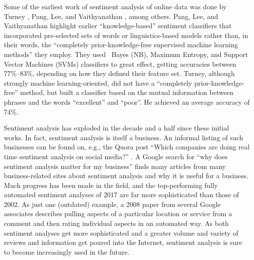 Some of the earliest work of sentiment analysis of online data was done by Turney \cite{turney2002}, Pang, Lee, and Vaithyanathan \cite{pang2002}, among others.  Pang, Lee, and Vaithyanathan highlight earlier ``knowledge-based'' sentiment classifiers that incorporated pre-selected sets of words or linguistics-based models rather than, in their words, the ``completely prior-knowledge-free supervised machine learning methods'' they employ.  They used \Na\ Bayes (NB), Maximum Entropy, and Support Vector Machines (SVMs) classifiers to great effect, getting accuracies between 77\%--83\%, depending on how they defined their feature set.  Turney, although strongly machine learning-oriented, did not have a ``completely prior-knowledge-free'' method, but built a classifier based on the mutual information between phrases and the words ``excellent'' and ``poor''.  He achieved an average accuracy of 74\%.

Sentiment analysis has exploded in the decade and a half since these initial works.  In fact, sentiment analysis is itself a business.  An informal listing of such businesses can be found on, e.g., the Quora post ``Which companies are doing real time sentiment analysis on social media?'' \cite{quora}.  A Google search for ``why does sentiment analysis matter for my business'' finds many articles from many business-related sites about sentiment analysis and why it is useful for a business.  Much progress has been made in the field, and the top-performing fully automated sentiment analyses of 2017 are far more sophisticated than those of 2002.  As just one (outdated) example, a 2008 paper from several Google associates \cite{blair2008} describes pulling aspects of a particular location or service from a comment and then rating individual aspects in an automated way.  As both sentiment analyses get more sophisticated and a greater volume and variety of reviews and information get poured into the Internet, sentiment analysis is sure to become increasingly used in the future.